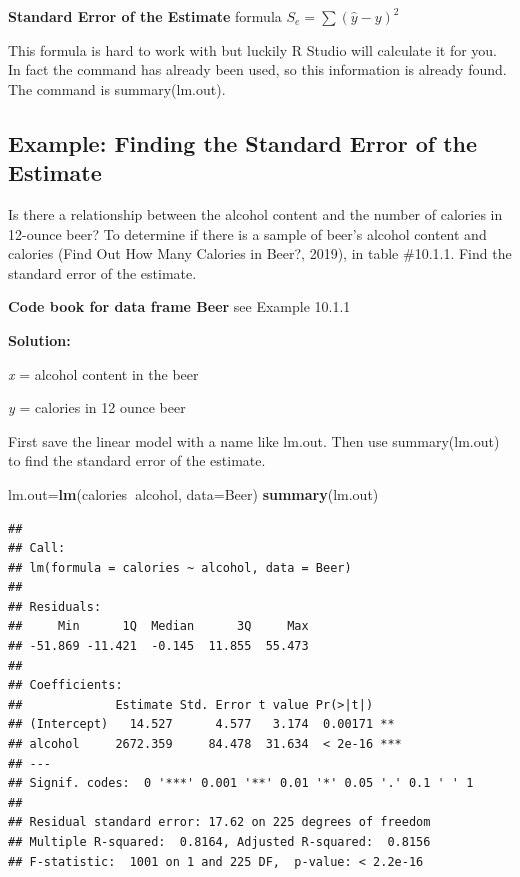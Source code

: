 \documentclass[]{book}
\newenvironment{Shaded}{\begin{snugshade}}{\end{snugshade}}
\newcommand{\DataTypeTok}[1]{\textcolor[rgb]{0.13,0.29,0.53}{#1}}
\newcommand{\KeywordTok}[1]{\textcolor[rgb]{0.13,0.29,0.53}{\textbf{#1}}}
\newcommand{\NormalTok}[1]{#1}
\newcommand{\OperatorTok}[1]{\textcolor[rgb]{0.81,0.36,0.00}{\textbf{#1}}}
\begin{document}
\textbf{Standard Error of the Estimate} formula \(S_e=\sum{(\hat{y}-y)^2}\)

This formula is hard to work with but luckily R Studio will calculate it for you. In fact the command has already been used, so this information is already found. The command is summary(lm.out).

\hypertarget{example-finding-the-standard-error-of-the-estimate}{%
\subsection{Example: Finding the Standard Error of the Estimate}\label{example-finding-the-standard-error-of-the-estimate}}

Is there a relationship between the alcohol content and the number of calories in 12-ounce beer? To determine if there is a sample of beer's alcohol content and calories (Find Out How Many Calories in Beer?, 2019), in table \#10.1.1. Find the standard error of the estimate.

\textbf{Code book for data frame Beer} see Example 10.1.1

\textbf{Solution:}

\emph{x} = alcohol content in the beer

\emph{y} = calories in 12 ounce beer

First save the linear model with a name like lm.out. Then use summary(lm.out) to find the standard error of the estimate.

\begin{Shaded}
\begin{Highlighting}[]
\NormalTok{lm.out=}\KeywordTok{lm}\NormalTok{(calories}\OperatorTok{~}\NormalTok{alcohol, }\DataTypeTok{data=}\NormalTok{Beer)}
\KeywordTok{summary}\NormalTok{(lm.out)}
\end{Highlighting}
\end{Shaded}

\begin{verbatim}
## 
## Call:
## lm(formula = calories ~ alcohol, data = Beer)
## 
## Residuals:
##     Min      1Q  Median      3Q     Max 
## -51.869 -11.421  -0.145  11.855  55.473 
## 
## Coefficients:
##             Estimate Std. Error t value Pr(>|t|)    
## (Intercept)   14.527      4.577   3.174  0.00171 ** 
## alcohol     2672.359     84.478  31.634  < 2e-16 ***
## ---
## Signif. codes:  0 '***' 0.001 '**' 0.01 '*' 0.05 '.' 0.1 ' ' 1
## 
## Residual standard error: 17.62 on 225 degrees of freedom
## Multiple R-squared:  0.8164, Adjusted R-squared:  0.8156 
## F-statistic:  1001 on 1 and 225 DF,  p-value: < 2.2e-16
\end{verbatim}
\end{document}
